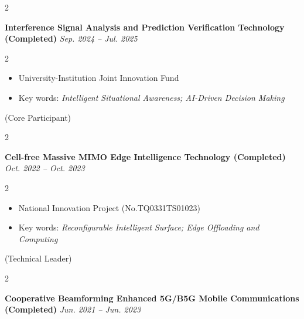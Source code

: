 \documentclass[10pt, letterpaper]{article}
\newenvironment{highlights}{
    \begin{itemize}[
        topsep=0.10 cm,
        parsep=0.10 cm,
        partopsep=0pt,
        itemsep=0pt,
        leftmargin=0 cm + 10pt
    ]
}{
    \end{itemize}
} %
\newenvironment{twocolentry}[2][]{
    \onecolentry
    \def\secondColumn{#2}
    \setcolumnwidth{\fill, 4.5 cm}
    \begin{paracol}{2}
}{
    \switchcolumn \raggedleft \secondColumn
    \end{paracol}
    \endonecolentry
} %
\begin{document}
        \begin{twocolentry}{
        		\textit{Sep. 2024 – Jul. 2025}
        	}
        	\textbf{Interference Signal Analysis and Prediction Verification Technology {\footnotesize{(Completed)}}}\end{twocolentry}
        
        \vspace{0.10 cm}
        
        \begin{twocolentry}{
        		(Core Participant) 
        	}
        	\begin{highlights}
        		\item University-Institution Joint Innovation Fund
        		\item Key words: \textit{Intelligent Situational Awareness; AI-Driven Decision Making}
        	\end{highlights}
        \end{twocolentry}
        
        \vspace{0.1 cm}


        \begin{twocolentry}{
            \textit{Oct. 2022 – Oct. 2023}
        }
            \textbf{Cell-free Massive MIMO Edge Intelligence Technology {\footnotesize{(Completed)}}}\end{twocolentry}

        \vspace{0.10 cm}

        \begin{twocolentry}{
                    (Technical Leader) 
        }
            \begin{highlights}
            \item National Innovation Project {\footnotesize{(No.TQ0331TS01023)}}
                \item Key words: \textit{Reconfigurable Intelligent Surface; Edge Offloading and Computing}
            \end{highlights}
            \end{twocolentry}
            
       \vspace{0.1 cm}
       
       \begin{twocolentry}{
       		\textit{Jun. 2021 – Jun. 2023}
       	}
       	\textbf{Cooperative Beamforming Enhanced 5G/B5G Mobile Communications {\footnotesize{(Completed)}}}\end{twocolentry}
       
\end{document}
